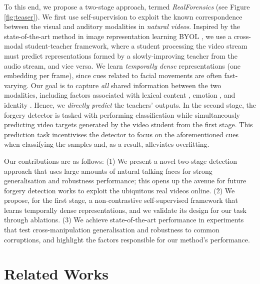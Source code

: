 \documentclass[10pt,twocolumn,letterpaper]{article}
\begin{document}
To this end, we propose a two-stage approach, termed \textit{RealForensics} (see Figure \ref{fig:teaser}). We first use self-supervision to exploit the known correspondence between the visual and auditory modalities in \textit{natural videos}. Inspired by the state-of-the-art method in image representation learning BYOL \cite{grill2020bootstrap}, we use a cross-modal student-teacher framework, where a student processing the video stream must predict representations formed by a slowly-improving teacher from the audio stream, and vice versa. We learn \textit{temporally dense} representations (one embedding per frame), since cues related to facial movements are often fast-varying. Our goal is to capture \textit{all} shared information between the two modalities, including factors associated with lexical content \cite{chung2016out}, emotion \cite{shukla2021does}, and identity \cite{nagrani2018learnable}. Hence, we \textit{directly predict} the teachers' outputs. In the second stage, the forgery detector is tasked with performing classification while simultaneously predicting video targets generated by the video student from the first stage. This prediction task incentivises the detector to focus on the aforementioned cues when classifying the samples and, as a result, alleviates overfitting.

Our contributions are as follows: (1) We present a novel two-stage detection approach that uses large amounts of natural talking faces for strong generalisation and robustness performance; this opens up the avenue for future forgery detection works to exploit the ubiquitous real videos online. (2) We propose, for the first stage, a non-contrastive self-supervised framework that learns temporally dense representations, and we validate its design for our task through ablations. (3) We achieve state-of-the-art performance in experiments that test cross-manipulation generalisation and robustness to common corruptions, and highlight the factors responsible for our method's performance.

\section{Related Works}
\end{document}
